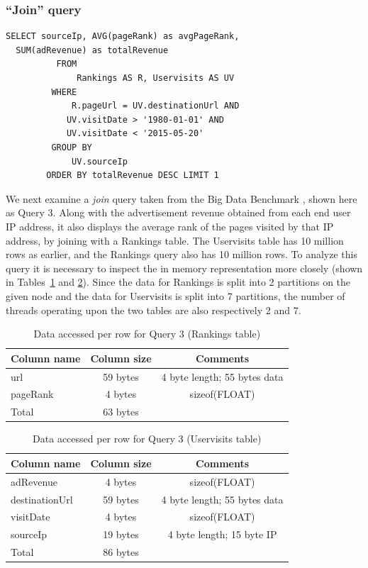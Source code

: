 \documentclass[9pt]{sig-alternate-05-2015}
\begin{document}
\subsubsection{``Join'' query}

\begin{small}
\begin{Verbatim}[frame=single,label=Query 3]
SELECT sourceIp, AVG(pageRank) as avgPageRank,
  SUM(adRevenue) as totalRevenue 
          FROM 
              Rankings AS R, Uservisits AS UV 
         WHERE 
             R.pageUrl = UV.destinationUrl AND 
            UV.visitDate > '1980-01-01' AND 
            UV.visitDate < '2015-05-20' 
         GROUP BY 
             UV.sourceIp 
        ORDER BY totalRevenue DESC LIMIT 1
\end{Verbatim}
\end{small}

We next examine a {\em join} query taken from the Big Data Benchmark
\cite{bigDataBenchmark}, shown here as Query 3. Along with the advertisement
revenue obtained from each end user IP address, it also displays the average
rank of the pages visited by that IP address, by joining with a Rankings table.
The Uservisits table has 10 million rows as earlier, and the Rankings query
also has 10 million rows.  To analyze this query it is necessary to inspect the
in memory representation more closely (shown in Tables~\ref{tbl:query3a} and
\ref{tbl:query3b}). Since the data for Rankings is split into 2 partitions on
the given node and the data for Uservisits is split into 7 partitions, the
number of threads operating upon the two tables are also respectively 2 and 7.
        
\begin{table}
\begin{tabular}[c]{|l|c|c|}
\hline
Column name & Column size & Comments \\
\hline
url & 59 bytes & 4 byte length; 55 bytes data \\
\hline
pageRank & 4 bytes & sizeof(FLOAT) \\
\hline
Total & 63 bytes & \\
\hline
\end{tabular}
\caption{\label{tbl:query3a}Data accessed per row for Query 3 (Rankings table)}
\end{table}

\begin{table}
\begin{tabular}[c]{|l|c|c|}
 \hline
 Column name & Column size & Comments \\
 \hline
 adRevenue & 4 bytes & sizeof(FLOAT) \\
 destinationUrl & 59 bytes & 4 byte length; 55 bytes data \\
 visitDate & 4 bytes & sizeof(FLOAT) \\
 sourceIp & 19 bytes & 4 byte length; 15 byte IP \\
 \hline
 Total & 86 bytes & \\
 \hline
 \end{tabular}
\caption{\label{tbl:query3b}Data accessed per row for Query 3 (Uservisits table)}
\end{table}
\end{document}

